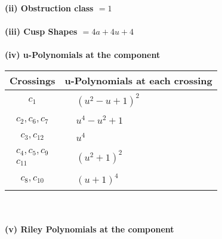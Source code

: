 \documentclass[1p]{elsarticle_modified}
\theoremstyle{definition}
\begin{document}
\flushleft \textbf{(ii) Obstruction class $= 1$}\\~\\
\flushleft \textbf{(iii) Cusp Shapes $= 4 a+4 u+4$}\\~\\
\newpage\renewcommand{\arraystretch}{1}
\flushleft \textbf{(iv) u-Polynomials at the component}\newline \\
\begin{tabular}{m{50pt}|m{274pt}}
Crossings & \hspace{64pt}u-Polynomials at each crossing \\
\hline $$\begin{aligned}c_{1}\end{aligned}$$&$\begin{aligned}
&(u^2- u+1)^2
\end{aligned}$\\
\hline $$\begin{aligned}c_{2},c_{6},c_{7}\end{aligned}$$&$\begin{aligned}
&u^4- u^2+1
\end{aligned}$\\
\hline $$\begin{aligned}c_{3},c_{12}\end{aligned}$$&$\begin{aligned}
&u^4
\end{aligned}$\\
\hline $$\begin{aligned}c_{4},c_{5},c_{9}\\c_{11}\end{aligned}$$&$\begin{aligned}
&(u^2+1)^2
\end{aligned}$\\
\hline $$\begin{aligned}c_{8},c_{10}\end{aligned}$$&$\begin{aligned}
&(u+1)^4
\end{aligned}$\\
\hline
\end{tabular}\\~\\
\newpage\renewcommand{\arraystretch}{1}
\flushleft \textbf{(v) Riley Polynomials at the component}\newline \\
\end{document}

